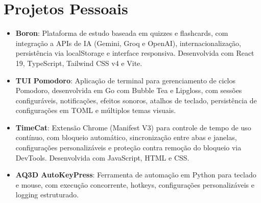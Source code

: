 \documentclass[a4paper,10pt]{article} %
\newcommand{\resumeItem}[2]{
  \item\small{
    \textbf{#1}{: #2 \vspace{-2pt}}
  }
}
\newcommand{\resumeSubItem}[2]{\resumeItem{#1}{#2}\vspace{-4pt}}
\newcommand{\resumeSubHeadingListStart}{\begin{itemize}[leftmargin=*]}
\newcommand{\resumeSubHeadingListEnd}{\end{itemize}}
\begin{document}


\section{Projetos Pessoais}
  \resumeSubHeadingListStart
    \resumeSubItem{Boron}
      {Plataforma de estudo baseada em quizzes e flashcards, com integração a APIs de IA (Gemini, Groq e OpenAI), internacionalização, persistência via localStorage e interface responsiva. Desenvolvida com React 19, TypeScript, Tailwind CSS v4 e Vite.}
    \resumeSubItem{TUI Pomodoro}
      {Aplicação de terminal para gerenciamento de ciclos Pomodoro, desenvolvida em Go com Bubble Tea e Lipgloss, com sessões configuráveis, notificações, efeitos sonoros, atalhos de teclado, persistência de configurações em TOML e múltiplos temas visuais.}
    \resumeSubItem{TimeCat}
      {Extensão Chrome (Manifest V3) para controle de tempo de uso contínuo, com bloqueio automático, sincronização entre abas e janelas, configurações personalizáveis e proteção contra remoção do bloqueio via DevTools. Desenvolvida com JavaScript, HTML e CSS.}
    \resumeSubItem{AQ3D AutoKeyPress}
      {Ferramenta de automação em Python para teclado e mouse, com execução concorrente, hotkeys, configurações personalizáveis e logging estruturado.}
  \resumeSubHeadingListEnd




\end{document}
